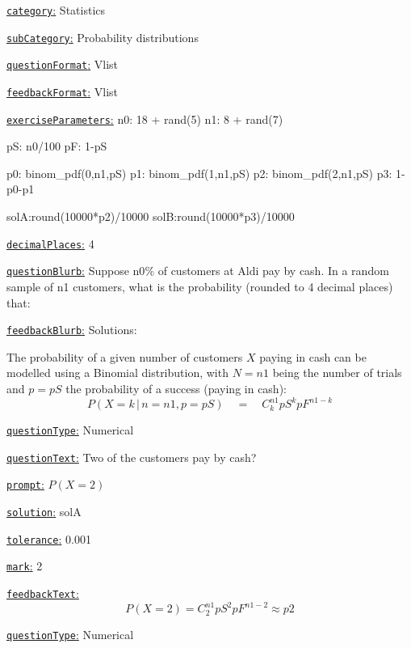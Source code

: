 \documentclass[preview]{standalone}
\newcommand \fieldname[1]{\underline{\texttt{#1}:}}
\begin{document}
\fieldname{category}  %
Statistics

\fieldname{subCategory} %
Probability distributions

\fieldname{questionFormat}
Vlist

\fieldname{feedbackFormat}
Vlist

\fieldname{exerciseParameters}
n0: 18 + rand(5)
n1: 8 + rand(7)

pS: n0/100
pF: 1-pS

p0: binom_pdf(0,n1,pS)
p1: binom_pdf(1,n1,pS)
p2: binom_pdf(2,n1,pS)
p3: 1-p0-p1

solA:round(10000*p2)/10000
solB:round(10000*p3)/10000

\fieldname{decimalPlaces}
4

\fieldname{questionBlurb}
Suppose {n0}\% of customers at Aldi pay by cash. In a random sample of {n1} customers, what is the probability (rounded to 4 decimal places) that:

\fieldname{feedbackBlurb}
Solutions:

The probability of a given number of customers $X$ paying in cash can be modelled using a Binomial distribution, with $N={n1}$ being the number of trials and $p={pS}$ the probability of a success (paying in cash):
\[
P(X=k \, | \, n={n1},p={pS}) \quad = \quad C^{{n1}}_k {pS}^k {pF}^{{n1}-k}
\]

\fieldname{questionType}
Numerical

\fieldname{questionText}
Two of the customers pay by cash?

\fieldname{prompt}
$P(X = 2)$

\fieldname{solution}
solA

\fieldname{tolerance}
0.001

\fieldname{mark}
2

\fieldname{feedbackText}
\[
P(X = 2)  = C^{{n1}}_2 {pS}^2 {pF}^{{n1}-2} \approx {p2}
\]

\fieldname{questionType}
Numerical
\end{document}
